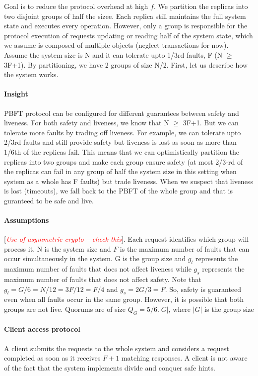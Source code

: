 \documentclass[twocolumn,10pt]{article}
\newcommand{\note}[1]{[\textcolor{red}{\textit{#1}}]}
\begin{document}
Goal is to reduce the protocol overhead at high $f$. We partition
the replicas into two disjoint groups of half the sizee. Each replica still maintains the 
full system
state and executes every operation. However, only a group is responsible for the
protocol execution of requests updating or reading half of the system state, which 
we assume is composed of multiple objects (neglect transactions for now). 
Assume the system size is N and it can tolerate upto 1/3rd faults, F
(N $\ge$ 3F+1). By partitioning, we have 2 groups of size N/2. First, let us describe how the
system works. 



\paragraph{Insight} PBFT protocol can be configured for different guarantees between safety
and liveness. For both safety and liveness, we know that N $\ge$ 3F+1. But we can tolerate
more faults by trading off  liveness. For example, we can tolerate
upto 2/3rd faults and still provide safety but liveness is lost as soon as more than 1/6th 
of the replicas fail. This means that we can optimistically partition
the replicas into two groups and make each group ensure safety (at most
2/3-rd of the replicas can fail in any group of half the system size in this setting when system as a whole
has F faults) but trade liveness. When
we suspect that liveness is lost (timeouts), we fall back to the PBFT of the whole group and
that is guranteed to be safe and live. 

\paragraph{Assumptions} \note{Use of asymmetric crypto -- check this}. Each request identifies which group will
process it.  N is the system size and $F$ is the maximum number of faults that can occur
simultaneously in the system. G is the group size and $g_l$ represents the maximum number of faults
that does not affect liveness while $g_s$ represents the maximum number of faults that does
not affect safety. Note that $g_l=G/6=N/12=3F/12=F/4$ and $g_s = 2G/3=F$. So, safety is guaranteed
even when all faults occur in the same group. However, it is possible that both groups are not live.
Quorums are of size $Q_G=5/6.|G|$, where $|G|$ is the group size

\paragraph{Client access protocol} A client submits the requests to the whole system and considers
a request completed as soon as it receives $F+1$ matching responses. A client is not aware of the fact
that the system implements divide and conquer safe hints.
\end{document}

